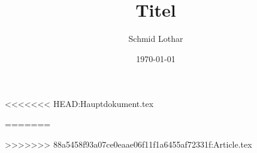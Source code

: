 \documentclass[a4paper, 12pt, twoside, titlepage,headsepline]{scrartcl}
\title{Titel}
\author{Schmid Lothar}
\date{\today}
\begin{document}
\maketitle[-1]


<<<<<<< HEAD:Hauptdokument.tex

=======


>>>>>>> 88a5458f93a07ce0eaae06f11f1a6455af72331f:Article.tex




\end{document}
